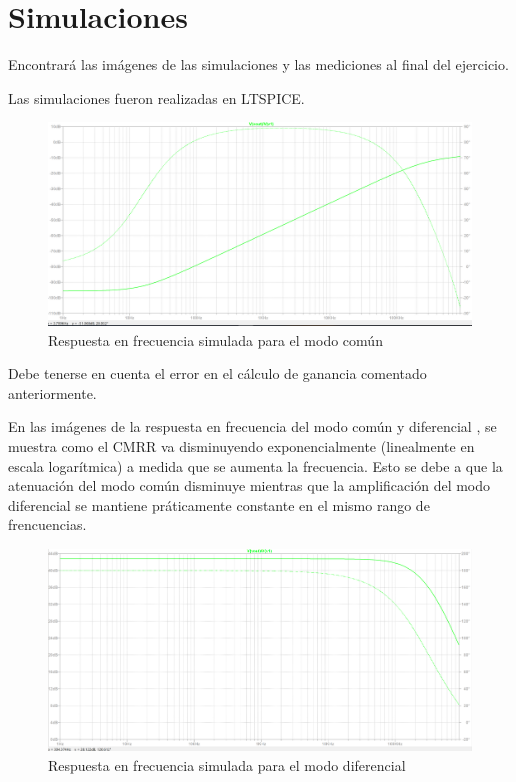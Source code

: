 \documentclass[../../tc_tp3_main.tex]{subfiles}
\begin{document}
\section{Simulaciones}

Encontrará las imágenes de las simulaciones y las mediciones al final del ejercicio.\par
Las simulaciones fueron realizadas en LTSPICE.
	\begin{figure}[h!]	
		\centering
		\includegraphics[scale=0.3]{imagenes/bode_comun_simulado.png}
		\caption{Respuesta en frecuencia simulada para el modo común}
		\label{fig:ej5_bode_diferencial_simulado}
	\end{figure}

Debe tenerse en cuenta el error en el cálculo de ganancia comentado anteriormente.\par
En las imágenes de la respuesta en frecuencia del modo común y diferencial , se muestra como el CMRR va disminuyendo exponencialmente (linealmente en escala logarítmica) a medida que se aumenta la frecuencia. Esto se debe a que la atenuación del modo común disminuye mientras que la amplificación del modo diferencial se mantiene práticamente constante en el mismo rango de frencuencias.\par

	\begin{figure}[h!]	
		\centering
		\includegraphics[scale=0.3]{imagenes/bode_diferencial_simulado.png}
		\caption{Respuesta en frecuencia simulada para el modo diferencial}
		\label{fig:ej5_bode_diferencial_simulado}
	\end{figure}
	
\end{document}
